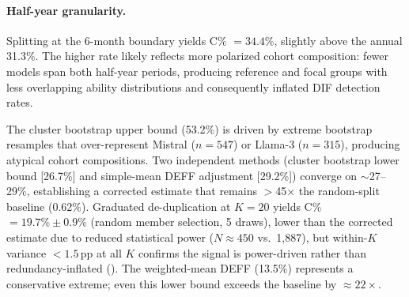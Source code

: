 \begin{table}[h]
\centering
\caption{Comparison of uncertainty quantification methods for the 31.3\% C\% estimate on MMLU.}
\small
{}
\label{tab:uncertainty}
\end{table}

\paragraph{Half-year granularity.} Splitting at the 6-month boundary yields C\% $= 34.4\%$, slightly above the annual 31.3\%. The higher rate likely reflects more polarized cohort composition: fewer models span both half-year periods, producing reference and focal groups with less overlapping ability distributions and consequently inflated DIF detection rates.

The cluster bootstrap upper bound (53.2\%) is driven by extreme bootstrap resamples that over-represent Mistral ($n = 547$) or Llama-3 ($n = 315$), producing atypical cohort compositions. Two independent methods (cluster bootstrap lower bound [26.7\%] and simple-mean DEFF adjustment [29.2\%]) converge on $\sim$27--29\%, establishing a corrected estimate that remains $>$45$\times$ the random-split baseline (0.62\%). Graduated de-duplication at $K{=}20$ yields C\% $= 19.7\% \pm 0.9\%$ (random member selection, 5 draws), lower than the corrected estimate due to reduced statistical power ($N \approx 450$ vs.\ 1,887), but within-$K$ variance ${<}1.5$\,pp at all $K$ confirms the signal is power-driven rather than redundancy-inflated (). The weighted-mean DEFF (13.5\%) represents a conservative extreme; even this lower bound exceeds the baseline by ${\approx}22\times$.

